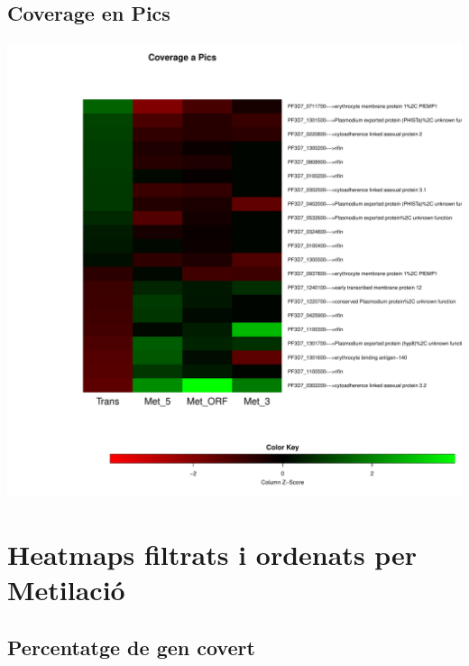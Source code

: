 \documentclass{article}\usepackage[]{graphicx}\usepackage[]{color}
\newenvironment{knitrout}{}{} %
\begin{document}
\subsection{Coverage en Pics}
\begin{knitrout}
\color{fgcolor}

{\centering \includegraphics[width=.9\linewidth]{figure/minimal-trans_covapics-1} 

}



\end{knitrout}
\clearpage


\section{Heatmaps filtrats i ordenats per Metilació}
\subsection{Percentatge de gen covert}
\end{document}
